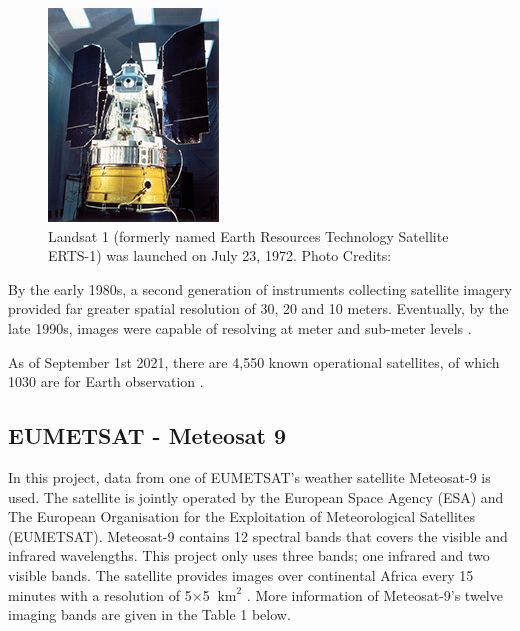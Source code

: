 \begin{figure}[H]
\centering

\includegraphics[totalheight=0.2\textheight]{Landsat1.jpg}
\caption{Landsat 1 (formerly named Earth Resources Technology Satellite ERTS-1) was launched on July 23, 1972. Photo Credits: \cite{landsat1}
}
\end{figure}

By the early 1980s, a second generation of instruments collecting satellite imagery provided far greater spatial resolution of 30, 20 and 10 meters. Eventually, by the late 1990s, images were capable of resolving at meter and  sub-meter levels \cite{campbell2011introduction}.

\par


As of September 1st 2021, there are 4,550 known operational satellites, of which 1030 are for Earth observation \cite{Sat_Data}. 


\subsection{EUMETSAT - Meteosat 9}


In this project, data from one of EUMETSAT's weather satellite Meteosat-9 is used. The satellite is jointly operated by the European Space Agency (ESA) and The European Organisation for the Exploitation of Meteorological Satellites (EUMETSAT). Meteosat-9 contains 12 spectral bands that covers the visible and infrared wavelengths. This project only uses three bands; one infrared and two visible bands. The satellite provides images over continental Africa every 15 minutes with a resolution of 5$\times$5 $\mathrm{~km}^{2}$ \cite{Meteosat9}. More information of Meteosat-9's twelve imaging bands are given in the Table 1 below.

